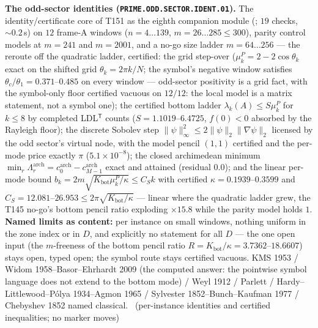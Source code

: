 \par\smallskip\noindent\textbf{The odd-sector identities
(\texttt{PRIME.ODD.SECTOR.IDENT.01}).}
The identity/certificate core of T151 as the eighth companion module
(; $19$ checks, ${\sim}0.2$\,s) on
$12$ frame-A windows ($n=4\ldots139$, $m=26\ldots285\le300$), parity
control models at $m=241$ and $m=2001$, and a no-go size ladder
$m=64\ldots256$ --- the reroute off the quadratic ladder, certified: the
grid step-over ($\mu^P_k=2-2\cos\theta_k$ exact on the shifted grid
$\theta_k=2\pi k/N$; the symbol's negative window satisfies
$\theta_c/\theta_1=0.371$--$0.485$ on every window --- odd-sector
positivity is a grid fact, with the symbol-only floor certified vacuous on
$12/12$: the local model is a matrix statement, not a symbol one); the
certified bottom ladder $\lambda_k(A)\le S\mu^P_k$ for $k\le8$ by completed
LDL$^{\mathsf T}$ counts ($S=1.1019$--$6.4725$, $f(0)<0$ absorbed by the
Rayleigh floor); the discrete Sobolev step
$\|\psi\|_\infty^2\le2\|\psi\|_2\|\nabla\psi\|_2$ licensed by the odd
sector's virtual node, with the model pencil $(1,1)$ certified and the
per-mode price exactly $\pi$ ($5.1\times10^{-8}$); the closed archimedean
minimum $\min_r\Lambda^{\mathrm{arch}}_r=c^{\mathrm{arch}}_0-
c^{\mathrm{arch}}_{M-1}$ exact and attained (residual $0.0$); and the
linear per-mode bound $b_k=2m\sqrt{K_{\mathrm{bot}}\mu^P_k/\kappa}\le C_Sk$
with certified $\kappa=0.1939$--$0.3599$ and
$C_S=12.081$--$26.953\le2\pi\sqrt{K_{\mathrm{bot}}/\kappa}$ --- linear
where the quadratic ladder grew, the T145 no-go's bottom pencil ratio
exploding $\times15.8$ while the parity model holds $1$.
\textbf{Named limits as content:} per instance on small windows, nothing
uniform in the zone index or in $D$, and explicitly no statement for all
$D$ --- the one open input (the $m$-freeness of the bottom pencil ratio
$R=K_{\mathrm{bot}}/\kappa=3.7362$--$18.6607$) stays open, typed open; the
symbol route stays certified vacuous. KMS 1953 / Widom
1958--Basor--Ehrhardt 2009 (the computed answer: the pointwise symbol
language does not extend to the bottom mode) / Weyl 1912 / Parlett /
Hardy--Littlewood--P\'olya 1934--Agmon 1965 / Sylvester
1852--Bunch--Kaufman 1977 / Chebyshev 1852 named classical.
\mE\ (per-instance identities and certified inequalities; no marker moves)
\par\smallskip


